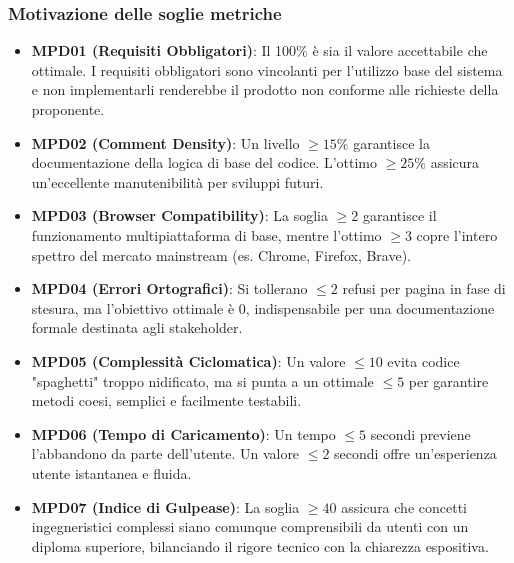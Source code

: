 \subsubsection*{Motivazione delle soglie metriche}
\begin{itemize}
    \item \textbf{MPD01 (Requisiti Obbligatori)}: Il 100\% è sia il valore accettabile che ottimale. I requisiti obbligatori sono vincolanti per l'utilizzo base del sistema e non implementarli renderebbe il prodotto non conforme alle richieste della proponente.
    \item \textbf{MPD02 (Comment Density)}: Un livello $\ge 15\%$ garantisce la documentazione della logica di base del codice. L'ottimo $\ge 25\%$ assicura un'eccellente manutenibilità per sviluppi futuri.
    \item \textbf{MPD03 (Browser Compatibility)}: La soglia $\ge 2$ garantisce il funzionamento multipiattaforma di base, mentre l'ottimo $\ge 3$ copre l'intero spettro del mercato mainstream (es. Chrome, Firefox, Brave).
    \item \textbf{MPD04 (Errori Ortografici)}: Si tollerano $\le 2$ refusi per pagina in fase di stesura, ma l'obiettivo ottimale è 0, indispensabile per una documentazione formale destinata agli stakeholder.
    \item \textbf{MPD05 (Complessità Ciclomatica)}: Un valore $\le 10$ evita codice "spaghetti" troppo nidificato, ma si punta a un ottimale $\le 5$ per garantire metodi coesi, semplici e facilmente testabili.
    \item \textbf{MPD06 (Tempo di Caricamento)}: Un tempo $\le 5$ secondi previene l'abbandono da parte dell'utente. Un valore $\le 2$ secondi offre un'esperienza utente istantanea e fluida.
    \item \textbf{MPD07 (Indice di Gulpease)}: La soglia $\ge 40$ assicura che concetti ingegneristici complessi siano comunque comprensibili da utenti con un diploma superiore, bilanciando il rigore tecnico con la chiarezza espositiva.
\end{itemize}
